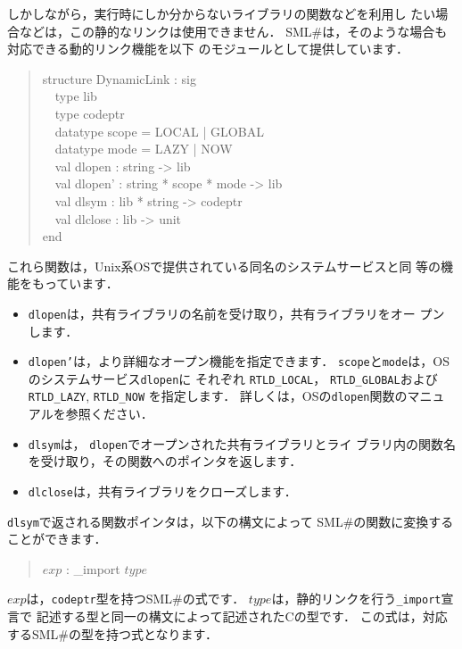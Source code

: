 \documentclass{jbook}
\newcommand{\smlsharp}{SML\#}
\newcommand{\myem}{\mbox{\ \ }}
\newenvironment{program}{\begin{quote}\begin{tt}}%
                        {\end{tt}\end{quote}}
\begin{document}
	しかしながら，実行時にしか分からないライブラリの関数などを利用し
たい場合などは，この静的なリンクは使用できません．
	\smlsharp{}は，そのような場合も対応できる動的リンク機能を以下
のモジュールとして提供しています．
\begin{program}
structure DynamicLink : sig\\
\myem  type lib\\
\myem  type codeptr\\
\myem  datatype scope = LOCAL | GLOBAL\\
\myem  datatype mode = LAZY | NOW\\
\myem  val dlopen : string -> lib\\
\myem  val dlopen' : string * scope * mode -> lib\\
\myem  val dlsym : lib * string -> codeptr\\
\myem  val dlclose : lib -> unit\\
end
\end{program}
	これら関数は，Unix系OSで提供されている同名のシステムサービスと同
等の機能をもっています．
\begin{itemize}
\item  {\tt dlopen}は，共有ライブラリの名前を受け取り，共有ライブラリをオー
プンします．
\item  {\tt dlopen'}は，より詳細なオープン機能を指定できます．
	{\tt scope}と{\tt mode}は，OSのシステムサービス{\tt dlopen}に
それぞれ
{\tt RTLD\_LOCAL}，
{\tt RTLD\_GLOBAL}および
{\tt RTLD\_LAZY},
{\tt RTLD\_NOW}
を指定します．
	詳しくは，OSの{\tt dlopen}関数のマニュアルを参照ください．
\item {\tt dlsym}は， {\tt dlopen}でオープンされた共有ライブラリとライ
ブラリ内の関数名を受け取り，その関数へのポインタを返します．
\item  {\tt dlclose}は，共有ライブラリをクローズします．
\end{itemize}
	{\tt dlsym}で返される関数ポインタは，以下の構文によって
\smlsharp{}の関数に変換することができます．
\begin{program}
$\mathit{exp}$ : \_import $\mathit{type}$
\end{program}
	$\mathit{exp}$は，{\tt codeptr}型を持つ\smlsharp{}の式です．
	$\mathit{type}$は，静的リンクを行う{\tt \_import}宣言で
記述する型と同一の構文によって記述されたCの型です．
	この式は，対応する\smlsharp{}の型を持つ式となります．
\end{document}
